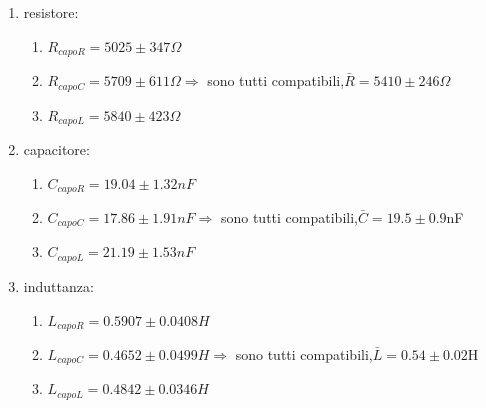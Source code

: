 \documentclass{article}
\theoremstyle{definition}
\begin{document}
\begin{enumerate}
    \item resistore:
    \begin{enumerate}
        \item \(R_{capoR} = 5025 \pm 347 \Omega\)
        \item \(R_{capoC} = 5709 \pm 611 \Omega \Rightarrow\) sono tutti compatibili,\(\bar{R} = 5410 \pm 246 \Omega\)
        \item \(R_{capoL} = 5840 \pm 423 \Omega\)
    \end{enumerate}
    \item capacitore:
    \begin{enumerate}
        \item \(C_{capoR} = 19.04 \pm 1.32  nF\)
        \item \(C_{capoC} = 17.86 \pm 1.91 nF \Rightarrow\) sono tutti compatibili,\(\bar{C} = 19.5 \pm 0.9\)nF
        \item \(C_{capoL} = 21.19 \pm 1.53 nF\)
    \end{enumerate}
    \item induttanza:
    \begin{enumerate}
        \item \(L_{capoR} = 0.5907 \pm 0.0408 H\)
        \item \(L_{capoC} = 0.4652 \pm 0.0499H \Rightarrow\) sono tutti compatibili,\(\bar{L} = 0.54  \pm 0.02 \)H
        \item \(L_{capoL} = 0.4842 \pm 0.0346 H\)
    \end{enumerate}
\end{enumerate}
   
\end{document}
